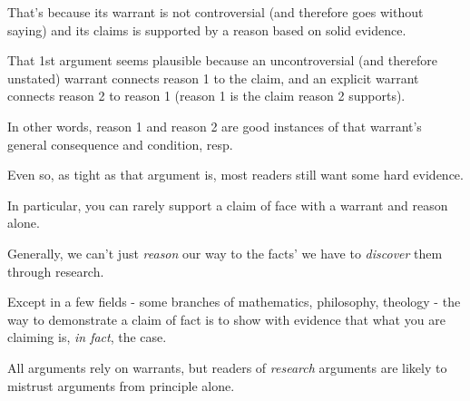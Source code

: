 \documentclass[oneside]{book}
\numberwithin{equation}{section}
\begin{document}
That's because its warrant is not controversial (and therefore goes without saying) and its claims is supported by a reason based on solid evidence.

That 1st argument seems plausible because an uncontroversial (and therefore unstated) warrant connects reason 1 to the claim, and an explicit warrant connects reason 2 to reason 1 (reason 1 is the claim reason 2 supports).

In other words, reason 1 and reason 2 are good instances of that warrant's general consequence and condition, resp.

Even so, as tight as that argument is, most readers still want some hard evidence.

%
In particular, you can rarely support a claim of face with a warrant and reason alone.

Generally, we can't just \textit{reason} our way to the facts' we have to \textit{discover} them through research.

Except in a few fields - some branches of mathematics, philosophy, theology - the way to demonstrate a claim of fact is to show with evidence that what you are claiming is, \textit{in fact}, the case.

%
All arguments rely on warrants, but readers of \textit{research} arguments are likely to mistrust arguments from principle alone.

\end{document}
